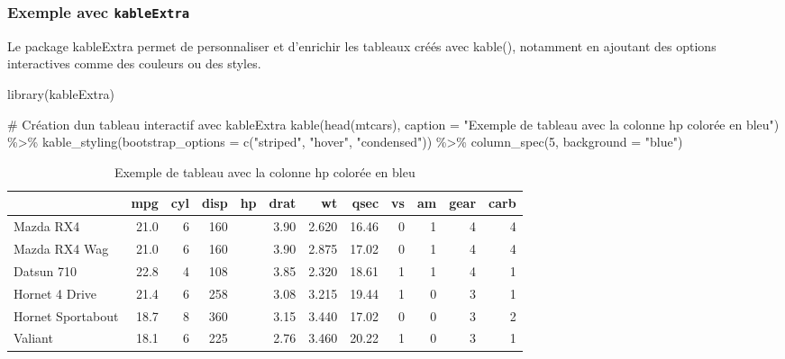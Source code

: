 \documentclass[
  letterpaper,
  DIV=11,
  numbers=noendperiod]{scrreprt}
\newenvironment{Shaded}{\begin{snugshade}}{\end{snugshade}}
\newcommand{\AttributeTok}[1]{\textcolor[rgb]{0.40,0.45,0.13}{#1}}
\newcommand{\CommentTok}[1]{\textcolor[rgb]{0.37,0.37,0.37}{#1}}
\newcommand{\DecValTok}[1]{\textcolor[rgb]{0.68,0.00,0.00}{#1}}
\newcommand{\FunctionTok}[1]{\textcolor[rgb]{0.28,0.35,0.67}{#1}}
\newcommand{\NormalTok}[1]{\textcolor[rgb]{0.00,0.23,0.31}{#1}}
\newcommand{\SpecialCharTok}[1]{\textcolor[rgb]{0.37,0.37,0.37}{#1}}
\newcommand{\StringTok}[1]{\textcolor[rgb]{0.13,0.47,0.30}{#1}}
\begin{document}
\subsubsection{\texorpdfstring{Exemple avec
\texttt{kableExtra}}{Exemple avec kableExtra}}\label{exemple-avec-kableextra}

Le package kableExtra permet de personnaliser et d'enrichir les tableaux
créés avec kable(), notamment en ajoutant des options interactives comme
des couleurs ou des styles.

\begin{Shaded}
\begin{Highlighting}[]
\FunctionTok{library}\NormalTok{(kableExtra)}
\end{Highlighting}
\end{Shaded}

\begin{Shaded}
\begin{Highlighting}[]
\CommentTok{\# Création d\textquotesingle{}un tableau interactif avec kableExtra}
\FunctionTok{kable}\NormalTok{(}\FunctionTok{head}\NormalTok{(mtcars), }\AttributeTok{caption =} \StringTok{"Exemple de tableau avec la colonne hp colorée en bleu"}\NormalTok{) }\SpecialCharTok{\%\textgreater{}\%}
  \FunctionTok{kable\_styling}\NormalTok{(}\AttributeTok{bootstrap\_options =} \FunctionTok{c}\NormalTok{(}\StringTok{"striped"}\NormalTok{, }\StringTok{"hover"}\NormalTok{, }\StringTok{"condensed"}\NormalTok{)) }\SpecialCharTok{\%\textgreater{}\%}
  \FunctionTok{column\_spec}\NormalTok{(}\DecValTok{5}\NormalTok{, }\AttributeTok{background =} \StringTok{"blue"}\NormalTok{)}
\end{Highlighting}
\end{Shaded}

\begin{longtable}[t]{lrrr>{}rrrrrrrr}
\caption{\label{tab:unnamed-chunk-17}Exemple de tableau avec la colonne hp colorée en bleu}\\
\toprule
 & mpg & cyl & disp & hp & drat & wt & qsec & vs & am & gear & carb\\
\midrule
Mazda RX4 & 21.0 & 6 & 160 & \cellcolor{blue}{110} & 3.90 & 2.620 & 16.46 & 0 & 1 & 4 & 4\\
Mazda RX4 Wag & 21.0 & 6 & 160 & \cellcolor{blue}{110} & 3.90 & 2.875 & 17.02 & 0 & 1 & 4 & 4\\
Datsun 710 & 22.8 & 4 & 108 & \cellcolor{blue}{93} & 3.85 & 2.320 & 18.61 & 1 & 1 & 4 & 1\\
Hornet 4 Drive & 21.4 & 6 & 258 & \cellcolor{blue}{110} & 3.08 & 3.215 & 19.44 & 1 & 0 & 3 & 1\\
Hornet Sportabout & 18.7 & 8 & 360 & \cellcolor{blue}{175} & 3.15 & 3.440 & 17.02 & 0 & 0 & 3 & 2\\
\addlinespace
Valiant & 18.1 & 6 & 225 & \cellcolor{blue}{105} & 2.76 & 3.460 & 20.22 & 1 & 0 & 3 & 1\\
\bottomrule
\end{longtable}
\end{document}
